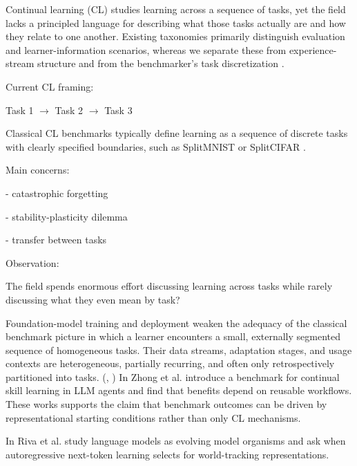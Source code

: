 \documentclass{article}
\begin{document}
        Continual learning (CL) studies learning across a sequence of tasks, yet the field lacks a principled language for describing what those tasks actually are and how they relate to one another. 
        Existing taxonomies primarily distinguish evaluation and learner-information scenarios, whereas we separate these from experience-stream structure and from the benchmarker’s task discretization \cite{van2022three}.

    
        Current CL framing:
        
        Task 1 $\rightarrow$ Task 2 $\rightarrow$ Task 3

        Classical CL benchmarks typically define learning as a sequence of discrete tasks with clearly specified boundaries, such as SplitMNIST or SplitCIFAR \cite{van2022three}.     
        
        Main concerns:
        
        - catastrophic forgetting
        
        - stability-plasticity dilemma
        
        - transfer between tasks
        
        Observation:
        
        The field spends enormous effort discussing learning across tasks while rarely discussing what they even mean by task?

        Foundation-model training and deployment weaken the adequacy of the classical benchmark picture in which a learner encounters a small, externally segmented sequence of homogeneous tasks. Their data streams, adaptation stages, and usage contexts are heterogeneous, partially recurring, and often only retrospectively partitioned into tasks. (\cite{thede2024reflecting}, \cite{ostapenko2022continual})
        In \cite{zhong2026skilllearnbench} Zhong et al. introduce a benchmark for continual skill learning in LLM agents and find that benefits depend on reusable workflows.
        These works supports the claim that benchmark outcomes can be driven by representational starting conditions rather than only CL mechanisms.

        In \cite{riva2026taskecologiesevolutionworldtracking} Riva et al. study language models as evolving model organisms and ask when autoregressive next-token learning selects for world-tracking representations. 
\end{document}
